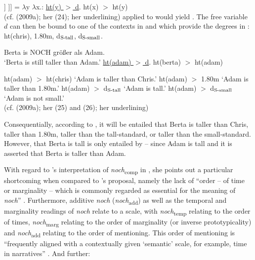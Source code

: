 \documentclass[output=paper,
modfonts
]{langscibook}
\begin{document}
\ea\relax [[ [$_{\textnormal{\footnotesize{AP}}}$ \textit{noch} [$_{\textnormal{\footnotesize{AP}}}$ \textit{größer} ]] ]] = $\lambda$y $\lambda$x.: \underline{ht(y) $>$ d}. ht(x) $>$ ht(y) \label{umbach's_meaning_of_noch} \\ (cf. \citeauthor{umbach2009a_comp} (2009a); her (24); her underlining)\z
{} applied to  would yield . The free variable $d$ can then be bound to one of the contexts in  and  which provide the degrees in : ht(chris), 1.80m, d$_{\textnormal{\scriptsize{S-tall}}}$, d$_{\textnormal{\scriptsize{S-small}}}$.

\ea\ea\label{umbach_25} Berta is NOCH größer als Adam. \\ {`Berta is still taller than Adam.'}
\ex    \label{umbach_repr_of_25} \underline{ht(adam) $>$ d}. ht(berta) $>$ ht(adam)  
\z\z

\ea \label{umbachs_context_degrees} \ea ht(adam) $>$ ht(chris) \hspace{22.5pt} `Adam is taller than Chris.'\label{umbach_26a}
\ex ht(adam) $>$ 1.80m          \hspace{33.5pt} `Adam is taller than 1.80m.'
\ex ht(adam) $>$ d$_{\textnormal{\scriptsize{S-tall}}}$   \hspace{35pt} `Adam is tall.' \label{umbach_26c}
\ex ht(adam) $>$ d$_{\textnormal{\scriptsize{S-small}}}$  \hspace{28.5pt} `Adam is not small.' \\ (cf. \citeauthor{umbach2009a_comp} (2009a); her (25) and (26); her underlining)
  \z\z

\noindent Consequentially, according to \citeauthor{umbach2009a_comp}, it will be entailed that Berta is taller than Chris, taller than 1.80m, taller than the tall-standard, or taller than the small-standard. However, that Berta is tall is only entailed by  -- since Adam is tall and it is asserted that Berta is taller than Adam.

With regard to \citeauthor{umbach2009a_comp}'s interpretation of \textit{noch}\textsubscript{comp} in , she points out a particular shortcoming when compared to \citeauthor{koenig1977}'s \citeyearpar{koenig1977} proposal, namely the lack of ``order -- of time or marginality -- which is commonly regarded as essential for the meaning of \textit{noch}'' \citep[p.12]{umbach2009a_comp}. Furthermore, additive \textit{noch} (\textit{noch}\textsubscript{add}) as well as the temporal and marginality readings of \textit{noch} relate to a scale, with \textit{noch}\textsubscript{temp} relating to the order of times, \textit{noch}\textsubscript{marg} relating to the order of marginality (or inverse prototypicality) and \textit{noch}\textsubscript{add} relating to the order of mentioning. This order of mentioning is ``frequently aligned with a contextually given `semantic' scale, for example, time in narratives'' \citep[p.12]{umbach2009a_comp}. And further:
\end{document}
